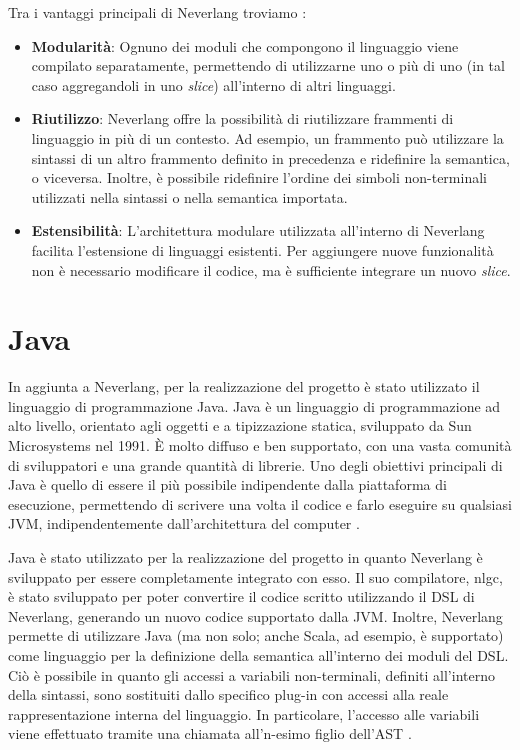 \documentclass[12pt,a4paper,openright,twoside]{book}
\begin{document}
Tra i vantaggi principali di Neverlang troviamo \cite{Cazzola2012}:
\begin{itemize}
    \item \textbf{Modularità}: Ognuno dei moduli che compongono il linguaggio viene compilato separatamente, permettendo di utilizzarne uno o 
    più di uno (in tal caso aggregandoli in uno \textit{slice}) all’interno di altri linguaggi.
    \item \textbf{Riutilizzo}: Neverlang offre la possibilità di riutilizzare frammenti di linguaggio in più di un contesto. Ad esempio, un 
    frammento può utilizzare la sintassi di un altro frammento definito in precedenza e ridefinire la semantica, o viceversa. Inoltre, è 
    possibile ridefinire l’ordine dei simboli non-terminali utilizzati nella sintassi o nella semantica importata.
    \item \textbf{Estensibilità}: L’architettura modulare utilizzata all’interno di Neverlang facilita l’estensione di linguaggi esistenti. 
    Per aggiungere nuove funzionalità non è necessario modificare il codice, ma è sufficiente integrare un nuovo \textit{slice}.
\end{itemize}


\section{Java}
In aggiunta a Neverlang, per la realizzazione del progetto è stato utilizzato il linguaggio di programmazione Java. Java è un linguaggio di 
programmazione ad alto livello, orientato agli oggetti e a tipizzazione statica, sviluppato da Sun Microsystems nel 1991. È molto diffuso e 
ben supportato, con una vasta comunità di sviluppatori e una grande quantità di librerie. Uno degli obiettivi principali di Java è quello di 
essere il più possibile indipendente dalla piattaforma di esecuzione, permettendo di scrivere una volta il codice e farlo eseguire su qualsiasi 
\ac{JVM}, indipendentemente dall'architettura del computer \cite{IBMWebsite}.

Java è stato utilizzato per la realizzazione del progetto in quanto Neverlang è sviluppato per essere completamente integrato con esso.
Il suo compilatore, nlgc, è stato sviluppato per poter convertire il codice scritto utilizzando il DSL di Neverlang, generando un nuovo codice
supportato dalla \ac{JVM}. Inoltre, Neverlang permette di utilizzare Java (ma non solo; anche Scala, ad esempio, è supportato) come linguaggio 
per la definizione della semantica all'interno dei moduli del \ac{DSL}. Ciò è possibile in quanto gli accessi a variabili non-terminali, 
definiti all'interno della sintassi, sono sostituiti dallo specifico plug-in con accessi alla reale rappresentazione interna del linguaggio. 
In particolare, l'accesso alle variabili viene effettuato tramite una chiamata all'n-esimo figlio dell'\ac{AST} \cite{Cazzola2013}.
\end{document}
